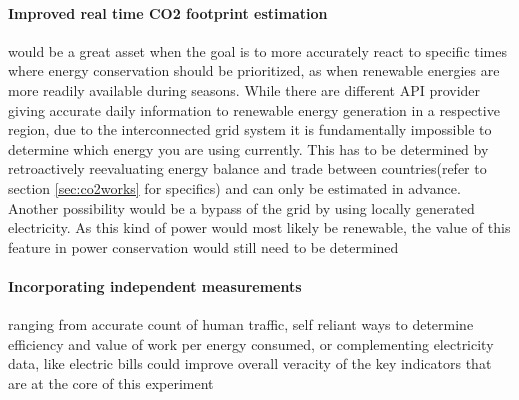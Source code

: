 \paragraph{Improved real time CO2 footprint estimation}would be a great asset when the goal is to more accurately react to specific times where energy conservation should be prioritized, as when renewable energies are more readily available during seasons. While there are different API provider giving accurate daily information to renewable energy generation \cite{co2_footprint_api} in a respective region, due to the interconnected grid system it is fundamentally impossible to determine which energy you are using currently. This has to be determined by retroactively reevaluating energy balance and trade between countries(refer to section \ref{sec:co2works} for specifics) and can only be estimated in advance. Another possibility would be a bypass of the grid by using locally generated electricity. As this kind of power would most likely be renewable, the value of this feature in power conservation would still need to be determined

\pagebreak
\paragraph{Incorporating independent measurements}ranging from accurate count of human traffic, self reliant ways to determine efficiency and value of work per energy consumed, or complementing electricity data, like electric bills could improve overall veracity of the key indicators that are at the core of this experiment

